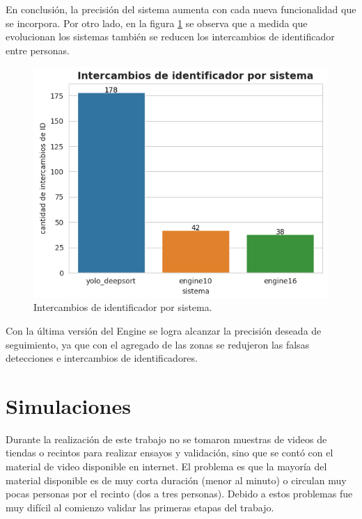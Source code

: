 En conclusión, la precisión del sistema aumenta con cada nueva funcionalidad que se incorpora. Por otro lado, en la figura \ref{fig:idSwitch} se observa que a medida que evolucionan los sistemas también se reducen los intercambios de identificador entre personas.

\newpage

\begin{figure}[ht]
	\centering
	\includegraphics[scale=.80]{./Figures/idSwitch.png}
	\caption{Intercambios de identificador por sistema.}
	\label{fig:idSwitch}
\end{figure}

Con la última versión del Engine se logra alcanzar la precisión deseada de seguimiento, ya que con el agregado de las zonas se redujeron las falsas detecciones e intercambios de identificadores.


\section{Simulaciones}
\label{sec:simulaciones}

Durante la realización de este trabajo no se tomaron muestras de videos de tiendas o recintos para realizar ensayos y validación, sino que se contó con el material de video disponible en internet. El problema es que la mayoría del material disponible es de muy corta duración (menor al minuto) o circulan muy pocas personas por el recinto (dos a tres personas). Debido a estos problemas fue muy difícil al comienzo validar las primeras etapas del trabajo.

